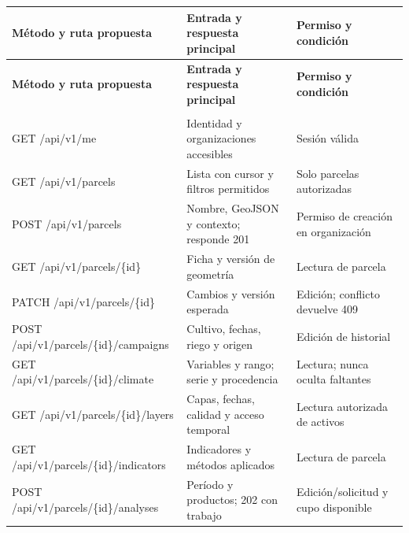 \documentclass[10pt,a4paper]{article}
\begin{document}
\begingroup\small
\begin{longtable}{>{\raggedright\arraybackslash}p{3.647cm}>{\raggedright\arraybackslash}p{5.867cm}>{\raggedright\arraybackslash}p{6.343cm}}
\toprule
\textbf{Método y ruta propuesta} & \textbf{Entrada y respuesta principal} & \textbf{Permiso y condición} \\
\midrule\endfirsthead
\toprule
\textbf{Método y ruta propuesta} & \textbf{Entrada y respuesta principal} & \textbf{Permiso y condición} \\
\midrule\endhead
\midrule\multicolumn{3}{r}{\scriptsize Continúa en la página siguiente}\\\endfoot
\bottomrule\endlastfoot
GET /\allowbreak{}api/\allowbreak{}v1/\allowbreak{}me & Identidad y organizaciones accesibles & Sesión válida \\[3pt]
GET /\allowbreak{}api/\allowbreak{}v1/\allowbreak{}parcels & Lista con cursor y filtros permitidos & Solo parcelas autorizadas \\[3pt]
POST /\allowbreak{}api/\allowbreak{}v1/\allowbreak{}parcels & Nombre, GeoJSON y contexto; responde 201 & Permiso de creación en organización \\[3pt]
GET /\allowbreak{}api/\allowbreak{}v1/\allowbreak{}parcels/\allowbreak{}\{id\} & Ficha y versión de geometría & Lectura de parcela \\[3pt]
PATCH /\allowbreak{}api/\allowbreak{}v1/\allowbreak{}parcels/\allowbreak{}\{id\} & Cambios y versión esperada & Edición; conflicto devuelve 409 \\[3pt]
POST /\allowbreak{}api/\allowbreak{}v1/\allowbreak{}parcels/\allowbreak{}\{id\}/\allowbreak{}campaigns & Cultivo, fechas, riego y origen & Edición de historial \\[3pt]
GET /\allowbreak{}api/\allowbreak{}v1/\allowbreak{}parcels/\allowbreak{}\{id\}/\allowbreak{}climate & Variables y rango; serie y procedencia & Lectura; nunca oculta faltantes \\[3pt]
GET /\allowbreak{}api/\allowbreak{}v1/\allowbreak{}parcels/\allowbreak{}\{id\}/\allowbreak{}layers & Capas, fechas, calidad y acceso temporal & Lectura autorizada de activos \\[3pt]
GET /\allowbreak{}api/\allowbreak{}v1/\allowbreak{}parcels/\allowbreak{}\{id\}/\allowbreak{}indicators & Indicadores y métodos aplicados & Lectura de parcela \\[3pt]
POST /\allowbreak{}api/\allowbreak{}v1/\allowbreak{}parcels/\allowbreak{}\{id\}/\allowbreak{}analyses & Período y productos; 202 con trabajo & Edición/\allowbreak{}solicitud y cupo disponible \\[3pt]

\end{longtable}
\end{document}
